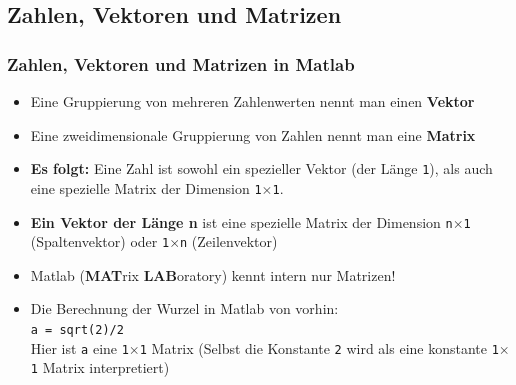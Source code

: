 \subsection{Zahlen, Vektoren und Matrizen}
\begin{frame}
  \frametitle{Zahlen, Vektoren und Matrizen in Matlab}
  \begin{itemize}
      \item Eine Gruppierung von mehreren Zahlenwerten nennt man einen \textbf{Vektor}
      \item Eine zweidimensionale Gruppierung von Zahlen nennt man eine \textbf{Matrix}
      \item \textbf{Es folgt:} Eine Zahl ist sowohl ein spezieller Vektor (der Länge \texttt{1}), als auch eine spezielle Matrix der Dimension \texttt{1$\times$1}.
      \item \textbf{Ein Vektor der Länge n} ist eine spezielle Matrix der Dimension \texttt{n$\times$1} (Spaltenvektor) oder \texttt{1$\times$n} (Zeilenvektor)
      \item Matlab (\textbf{MAT}rix \textbf{LAB}oratory) kennt intern nur Matrizen!
      \item Die Berechnung der Wurzel in Matlab von vorhin: \\
      \texttt{a = sqrt(2)/2} \\
      Hier ist \texttt{a} eine \texttt{1$\times$1} Matrix (Selbst die Konstante \texttt{2} wird als eine konstante \texttt{1$\times$1} Matrix interpretiert)
  \end{itemize}
\end{frame}







